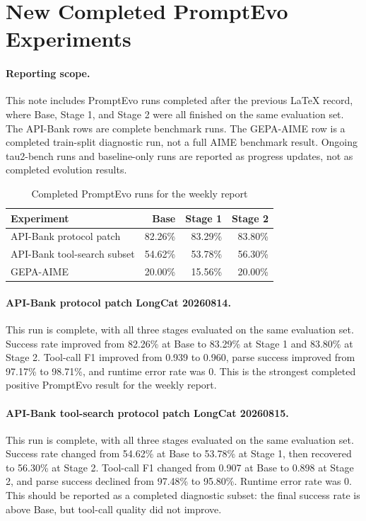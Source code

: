 \documentclass[11pt]{article}
\begin{document}
\section*{New Completed PromptEvo Experiments}

\paragraph{Reporting scope.}
This note includes PromptEvo runs completed after the previous LaTeX record,
where Base, Stage 1, and Stage 2 were all finished on the same evaluation set.
The API-Bank rows are complete benchmark runs. The GEPA-AIME row is a completed
train-split diagnostic run, not a full AIME benchmark result. Ongoing tau2-bench
runs and baseline-only runs are reported as progress updates, not as completed
evolution results.

\begin{table}[htbp]
\centering
\small
\caption{Completed PromptEvo runs for the weekly report}
\label{tab:promptevo-weekly-completed-20260831}
\begin{tabular}{lrrr}
\hline
Experiment & Base & Stage 1 & Stage 2 \\
\hline
API-Bank protocol patch & 82.26\% & 83.29\% & 83.80\% \\
API-Bank tool-search subset & 54.62\% & 53.78\% & 56.30\% \\
GEPA-AIME & 20.00\% & 15.56\% & 20.00\% \\
\hline
\end{tabular}
\end{table}

\paragraph{API-Bank protocol patch LongCat 20260814.}
This run is complete, with all three stages evaluated on the same evaluation
set. Success rate improved from 82.26\% at Base to 83.29\% at Stage 1 and
83.80\% at Stage 2. Tool-call F1 improved from 0.939 to 0.960, parse success
improved from 97.17\% to 98.71\%, and runtime error rate was 0. This is the
strongest completed positive PromptEvo result for the weekly report.

\paragraph{API-Bank tool-search protocol patch LongCat 20260815.}
This run is complete, with all three stages evaluated on the same evaluation
set. Success rate changed from 54.62\% at Base to 53.78\% at Stage 1, then
recovered to 56.30\% at Stage 2. Tool-call F1 changed from 0.907 at Base to
0.898 at Stage 2, and parse success declined from 97.48\% to 95.80\%. Runtime
error rate was 0. This should be reported as a completed diagnostic subset: the
final success rate is above Base, but tool-call quality did not improve.
\end{document}
